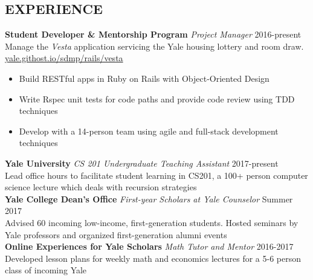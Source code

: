 \documentclass[margin, centered]{res}
\begin{document}
\begin{resume}
  \section{EXPERIENCE}
  \textbf{Student Developer \&  Mentorship Program} \textit{Project Manager} \hfill 2016-present \\
  Manage the \textit{Vesta} application servicing the Yale housing lottery and room draw. \\ 
  \href{yale.githost.io/sdmp/rails/vesta}{yale.githost.io/sdmp/rails/vesta}\smallskip{}
  \begin{itemize}
    \item Build RESTful apps in Ruby on Rails with Object-Oriented Design
    \item Write Rspec unit tests for code paths and provide code review using TDD techniques
    \item Develop with a 14-person team using agile and full-stack development techniques
  \end{itemize}
  \textbf{Yale University} \textit{CS 201 Undergraduate Teaching Assistant} \hfill 2017-present \\
  Lead office hours to facilitate student learning in CS201, a 100+ person computer science lecture which deals with recursion strategies \\ 
  \textbf{Yale College Dean's Office} \textit{First-year Scholars at Yale Counselor} \hfill Summer 2017 \\
  Advised 60 incoming low-income, first-generation students. Hosted seminars by Yale professors and organized first-generation alumni events \\
  \textbf{Online Experiences for Yale Scholars} \textit{Math Tutor and Mentor} \hfill 2016-2017 \\
  Developed lesson plans for weekly math and economics lectures for a 5-6 person class of incoming Yale 


\end{resume}
\end{document}
